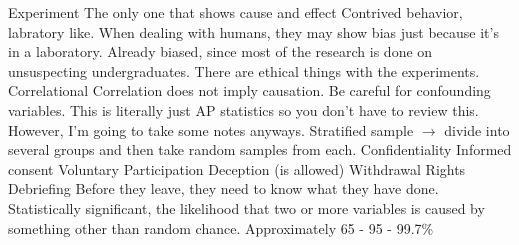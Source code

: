 \markdownRendererUlEndTight \markdownRendererUlItemEnd 
\markdownRendererUlItem Experiment\markdownRendererInterblockSeparator
{}\markdownRendererUlBeginTight
\markdownRendererUlItem The only one that shows cause and effect\markdownRendererUlItemEnd 
\markdownRendererUlItem Contrived behavior, labratory like.\markdownRendererUlItemEnd 
\markdownRendererUlItem When dealing with humans, they may show bias just because it's in a laboratory.\markdownRendererUlItemEnd 
\markdownRendererUlItem Already biased, since most of the research is done on unsuspecting undergraduates.\markdownRendererUlItemEnd 
\markdownRendererUlItem There are ethical things with the experiments.\markdownRendererUlItemEnd 
\markdownRendererUlEndTight \markdownRendererUlItemEnd 
\markdownRendererUlItem Correlational\markdownRendererInterblockSeparator
{}\markdownRendererUlBeginTight
\markdownRendererUlItem Correlation does not imply causation.\markdownRendererUlItemEnd 
\markdownRendererUlItem Be careful for confounding variables.\markdownRendererUlItemEnd 
\markdownRendererUlEndTight \markdownRendererUlItemEnd 
\markdownRendererUlEndTight \markdownRendererInterblockSeparator
{}\markdownRendererInterblockSeparator
{}This is literally just AP statistics so you don't have to review this. However, I'm going to take some notes anyways.\markdownRendererInterblockSeparator
{}\markdownRendererUlBeginTight
\markdownRendererUlItem Stratified sample $\rightarrow$ divide into several groups and then take random samples from each.\markdownRendererUlItemEnd 
\markdownRendererUlEndTight \markdownRendererInterblockSeparator
{}\markdownRendererInterblockSeparator
{}\markdownRendererUlBegin
\markdownRendererUlItem Confidentiality\markdownRendererUlItemEnd 
\markdownRendererUlItem Informed consent\markdownRendererUlItemEnd 
\markdownRendererUlItem Voluntary Participation\markdownRendererUlItemEnd 
\markdownRendererUlItem Deception (is allowed)\markdownRendererUlItemEnd 
\markdownRendererUlItem Withdrawal Rights\markdownRendererUlItemEnd 
\markdownRendererUlItem Debriefing\markdownRendererInterblockSeparator
{}\markdownRendererUlBeginTight
\markdownRendererUlItem Before they leave, they need to know what they have done.\markdownRendererUlItemEnd 
\markdownRendererUlEndTight \markdownRendererUlItemEnd 
\markdownRendererUlItem Statistically significant, the likelihood that two or more variables is caused by something other than random chance.\markdownRendererUlItemEnd 
\markdownRendererUlEnd \markdownRendererInterblockSeparator
{}\markdownRendererInterblockSeparator
{}Approximately 65 - 95 - 99.7\%\relax